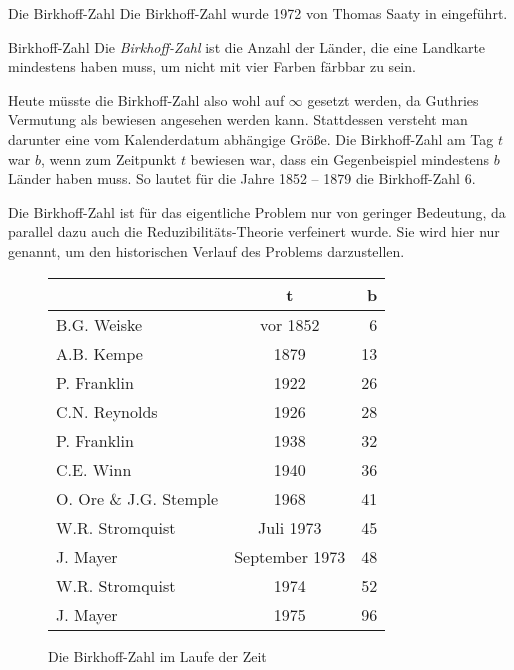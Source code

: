 \begin{section}{Die Birkhoff-Zahl}
 Die Birkhoff-Zahl wurde 1972 von Thomas Saaty in \cite{Saaty} eingeführt.
 
 \begin{definition}{Birkhoff-Zahl}
  Die \textit{Birkhoff-Zahl} ist die Anzahl der Länder, die eine Landkarte mindestens haben muss, um nicht mit vier Farben färbbar zu sein.
 \end{definition}
 
 Heute müsste die Birkhoff-Zahl also wohl auf $\infty$ gesetzt werden, da Guthries Vermutung als bewiesen angesehen werden kann. Stattdessen versteht man darunter eine vom Kalenderdatum abhängige Größe. Die Birkhoff-Zahl am Tag $t$ war $b$, wenn zum Zeitpunkt $t$ bewiesen war, dass ein Gegenbeispiel mindestens $b$ Länder haben muss. So lautet für die Jahre 1852 -- 1879 die Birkhoff-Zahl 6.
 
 Die Birkhoff-Zahl ist für das eigentliche Problem nur von geringer Bedeutung, da parallel dazu auch die Reduzibilitäts-Theorie verfeinert wurde. Sie wird hier nur genannt, um den historischen Verlauf des Problems darzustellen.
 
 \begin{figure}[hb]
  \label{birkhoffzahl}
  \centering
  \begin{tabular}{l | c | r}
   & t & b \\ \hline
   B.G. Weiske & vor 1852 & 6 \\
   A.B. Kempe & 1879 & 13 \\
   P. Franklin & 1922 & 26 \\
   C.N. Reynolds & 1926 & 28 \\
   P. Franklin & 1938 & 32 \\
   C.E. Winn & 1940 & 36 \\
   O. Ore \& J.G. Stemple & 1968 & 41 \\
   W.R. Stromquist & Juli 1973 & 45 \\
   J. Mayer & September 1973 & 48 \\
   W.R. Stromquist & 1974 & 52 \\
   J. Mayer & 1975 & 96 \\
  \end{tabular}
  \caption[Die Birkhoff-Zahl im Laufe der Zeit]{Die Birkhoff-Zahl im Laufe der Zeit}
 \end{figure}

 
\end{section}